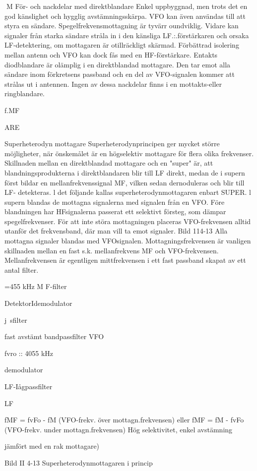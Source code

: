 \documentclass[a4paper,twoside,twocolumn,openright]{book}
\begin{document}
{{{M
För- och nackdelar med direktblandare
Enkel uppbyggnad, men trots det en god
känslighet och hygglig avstämningsskärpa.
VFO kan även användas till att styra en
sändare.
Spegelfrekvensmottagning är tyvärr
oundviklig. Vidare kan signaler från starka
sändare stråla in i den känsliga LF.:.förstärkaren och orsaka LF-detektering, om mottagaren är otillräckligt skärmad. Förbättrad
isolering mellan antenn och VFO kan dock
fås med en HF-förstärkare.
Entakts diodblandare är olämplig i en
direktblandad mottagare. Den tar emot alla
sändare inom förkretsens passband och en
del av VFO-signalen kommer att strålas ut i
antennen. Ingen av dessa nackdelar finns i
en mottakts-eller ringblandare.

f.MF

ARE

Superheterodyn mottagare
Superheterodynprincipen ger mycket större möjligheter, när önskemålet är en högselektiv mottagare för flera olika frekvenser.
Skillnaden mellan en direktblandad mottagare och en "super" är, att blandningsprodukterna i direktblandaren blir till LF direkt, medan de i supern först bildar en
mellanfrekvenssignal MF, vilken sedan
dernoduleras och blir till LF- detekteras.
l det följande kallas superheterodynmottagaren enbart SUPER. l supern blandas de mottagna signalerna med signalen
från en VFO. Före blandningen har HFsignalerna passerat ett selektivt försteg, som
dämpar spegelfrekvenser. För att inte störa
mottagningen placeras VFO-frekvensen alltid utanför det frekvensband, där man vill ta
emot signaler.
Bild 114-13
Alla mottagna signaler blandas med VFOsignalen. Mottagningsfrekvensen är vanligen skillnaden mellan en fast s.k. mellanfrekvens MF och VFO-frekvensen. Mellanfrekvensen är egentligen mittfrekvensen i
ett fast passband skapat av ett antal filter.

=455 kHz
M F-filter

DetektorIdemodulator

j~sfilter

fast avstämt bandpassfilter
VFO

fvro :: 4055 kHz

demodulator

LF-Iågpassfilter

LF

fMF = fvFo - fM (VFO-frekv. över mottagn.frekvensen)
eller
fMF = fM - fvFo (VFO-frekv. under mottagn.frekvensen)
Hög selektivitet, enkel avstämning {jämfört med en rak mottagare)

Bild II 4-13 Superheterodynmottagaren i princip

}}}}
\end{document}
